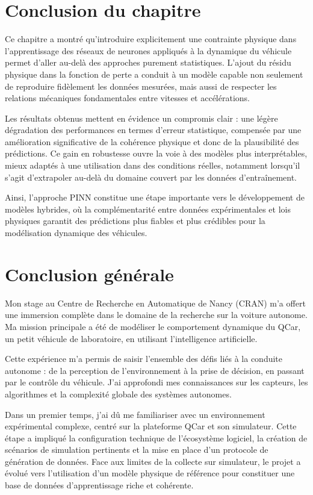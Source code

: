 \documentclass[12pt, a4paper]{report}
\begin{document}
\section{Conclusion du chapitre}
Ce chapitre a montré qu’introduire explicitement une contrainte physique dans l’apprentissage des réseaux de neurones appliqués à la dynamique du véhicule permet d’aller au-delà des approches purement statistiques. L’ajout du résidu physique dans la fonction de perte a conduit à un modèle capable non seulement de reproduire fidèlement les données mesurées, mais aussi de respecter les relations mécaniques fondamentales entre vitesses et accélérations.

Les résultats obtenus mettent en évidence un compromis clair : une légère dégradation des performances en termes d’erreur statistique, compensée par une amélioration significative de la cohérence physique et donc de la plausibilité des prédictions. Ce gain en robustesse ouvre la voie à des modèles plus interprétables, mieux adaptés à une utilisation dans des conditions réelles, notamment lorsqu’il s’agit d’extrapoler au-delà du domaine couvert par les données d’entraînement.

Ainsi, l’approche PINN constitue une étape importante vers le développement de modèles hybrides, où la complémentarité entre données expérimentales et lois physiques garantit des prédictions plus fiables et plus crédibles pour la modélisation dynamique des véhicules.

\newpage

\section*{Conclusion générale}

Mon stage au Centre de Recherche en Automatique de Nancy (CRAN) m’a offert une immersion complète dans le domaine de la recherche sur la voiture autonome. Ma mission principale a été de modéliser le comportement dynamique du QCar, un petit véhicule de laboratoire, en utilisant l’intelligence artificielle.

Cette expérience m’a permis de saisir l’ensemble des défis liés à la conduite autonome : de la perception de l’environnement à la prise de décision, en passant par le contrôle du véhicule. J’ai approfondi mes connaissances sur les capteurs, les algorithmes et la complexité globale des systèmes autonomes.

Dans un premier temps, j’ai dû me familiariser avec un environnement expérimental complexe, centré sur la plateforme QCar et son simulateur. Cette étape a impliqué la configuration technique de l’écosystème logiciel, la création de scénarios de simulation pertinents et la mise en place d’un protocole de génération de données. Face aux limites de la collecte sur simulateur, le projet a évolué vers l’utilisation d’un modèle physique de référence pour constituer une base de données d’apprentissage riche et cohérente.
\end{document}
